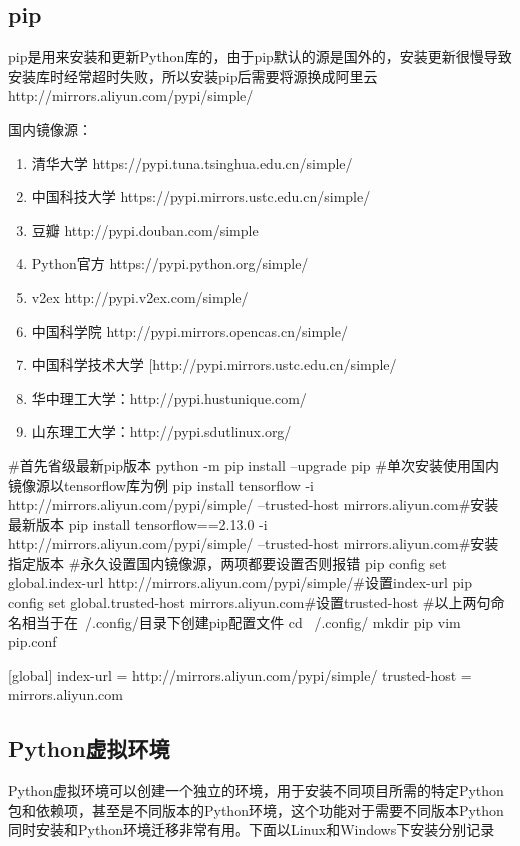 \subsection{pip}
pip是用来安装和更新Python库的，由于pip默认的源是国外的，安装更新很慢导致安装库时经常超时失败，所以安装pip后需要将源换成阿里云 http://mirrors.aliyun.com/pypi/simple/

国内镜像源：
\begin{enumerate}
	\item 清华大学 https://pypi.tuna.tsinghua.edu.cn/simple/
	\item 中国科技大学 https://pypi.mirrors.ustc.edu.cn/simple/
	\item 豆瓣 http://pypi.douban.com/simple
	\item Python官方 https://pypi.python.org/simple/
	\item v2ex http://pypi.v2ex.com/simple/
	\item 中国科学院 http://pypi.mirrors.opencas.cn/simple/
	\item 中国科学技术大学 [http://pypi.mirrors.ustc.edu.cn/simple/
	\item 华中理工大学：http://pypi.hustunique.com/
	\item 山东理工大学：http://pypi.sdutlinux.org/
\end{enumerate}
\begin{shell}
#首先省级最新pip版本
python -m pip install --upgrade pip
#单次安装使用国内镜像源以tensorflow库为例
pip install tensorflow -i http://mirrors.aliyun.com/pypi/simple/ --trusted-host mirrors.aliyun.com#安装最新版本
pip install tensorflow==2.13.0 -i http://mirrors.aliyun.com/pypi/simple/ --trusted-host mirrors.aliyun.com#安装指定版本
#永久设置国内镜像源，两项都要设置否则报错
pip config set global.index-url http://mirrors.aliyun.com/pypi/simple/#设置index-url
pip config set global.trusted-host mirrors.aliyun.com#设置trusted-host
#以上两句命名相当于在~/.config/目录下创建pip配置文件
cd ~/.config/
mkdir pip
vim pip.conf

[global]
index-url = http://mirrors.aliyun.com/pypi/simple/
trusted-host = mirrors.aliyun.com
\end{shell}
\subsection{Python虚拟环境}
Python虚拟环境可以创建一个独立的环境，用于安装不同项目所需的特定Python包和依赖项，甚至是不同版本的Python环境，这个功能对于需要不同版本Python同时安装和Python环境迁移非常有用。下面以Linux和Windows下安装分别记录

